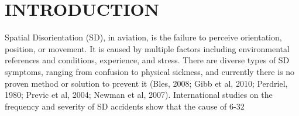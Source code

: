 \documentclass[11pt, onecolumn]{article}
\begin{document}


\maketitle

\section{INTRODUCTION}
\label{sec:introduction}

Spatial Disorientation (SD), in aviation, is the failure to perceive orientation, position, or movement. It is caused by multiple factors including environmental references and conditions, experience, and stress.  There are diverse types of SD symptoms, ranging from confusion to physical sickness, and currently there is no proven method or solution to prevent it (Bles, 2008; Gibb et al, 2010; Perdriel, 1980; Previc et al, 2004; Newman et al, 2007).  International studies on the frequency and severity of SD accidents show that the cause of 6-32%
\end{document}
